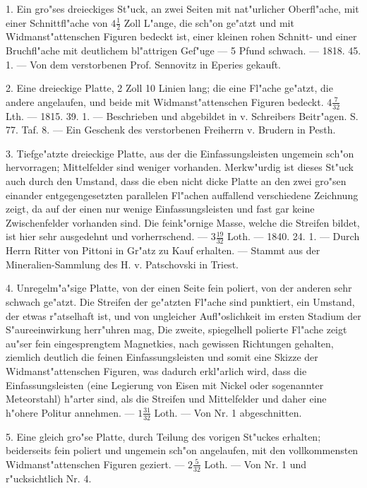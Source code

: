 \documentclass[a4paper, 11pt, oneside, polutonikogreek, german]{article}
\begin{document}
1. Ein gro"ses dreieckiges St"uck, an zwei Seiten mit nat"urlicher Oberfl"ache, mit einer Schnittfl"ache von $4\frac{1}{2}$ Zoll L"ange, die sch"on ge"atzt und mit Widmanst"attenschen Figuren bedeckt ist, einer kleinen rohen Schnitt- und einer Bruchfl"ache mit deutlichem bl"attrigen Gef"uge --- 5 Pfund schwach. --- 1818. 45. 1. --- Von dem verstorbenen Prof. Sennovitz in Eperies gekauft.

2. Eine dreieckige Platte, 2 Zoll 10 Linien lang; die eine Fl"ache ge"atzt, die andere angelaufen, und beide mit Widmanst"attenschen Figuren bedeckt. $4\frac{7}{32}$ Lth. --- 1815. 39. 1. --- Beschrieben und abgebildet in v. Schreibers Beitr"agen. S. 77. Taf. 8. --- Ein Geschenk des verstorbenen Freiherrn v. Brudern in Pesth.

3. Tiefge"atzte dreieckige Platte, aus der die Einfassungsleisten ungemein sch"on hervorragen; Mittelfelder sind weniger vorhanden. Merkw"urdig ist dieses St"uck auch durch den Umstand, dass die eben nicht dicke Platte an den zwei gro"sen einander entgegengesetzten parallelen Fl"achen auffallend verschiedene Zeichnung zeigt, da auf der einen nur wenige Einfassungsleisten und fast gar keine Zwischenfelder vorhanden sind. Die feink"ornige Masse, welche die Streifen bildet, ist hier sehr ausgedehnt und vorherrschend. --- $3\frac{19}{32}$ Loth. --- 1840. 24. 1. --- Durch Herrn Ritter von Pittoni in Gr"atz zu Kauf erhalten. --- Stammt aus der Mineralien-Sammlung des H. v. Patschovski in Triest.

4. Unregelm"a"sige Platte, von der einen Seite fein poliert, von der anderen sehr schwach ge"atzt. Die Streifen der ge"atzten Fl"ache sind punktiert, ein Umstand, der etwas r"atselhaft ist, und von ungleicher Aufl"oslichkeit im ersten Stadium der S"aureeinwirkung herr"uhren mag, Die zweite, spiegelhell polierte Fl"ache zeigt au"ser fein eingesprengtem Magnetkies, nach gewissen Richtungen gehalten, ziemlich deutlich die feinen Einfassungsleisten und somit eine Skizze der Widmanst"attenschen Figuren, was dadurch erkl"arlich wird, dass die Einfassungsleisten (eine Legierung von Eisen mit Nickel oder sogenannter Meteorstahl) h"arter sind, als die Streifen und Mittelfelder und daher eine h"ohere Politur annehmen. --- $1\frac{31}{32}$ Loth. --- Von Nr. 1 abgeschnitten.

5. Eine gleich gro"se Platte, durch Teilung des vorigen St"uckes erhalten; beiderseits fein poliert und ungemein sch"on angelaufen, mit den vollkommensten Widmanst"attenschen Figuren geziert. --- $2\frac{5}{32}$ Loth. --- Von Nr. 1 und r"ucksichtlich Nr. 4.
\end{document}

